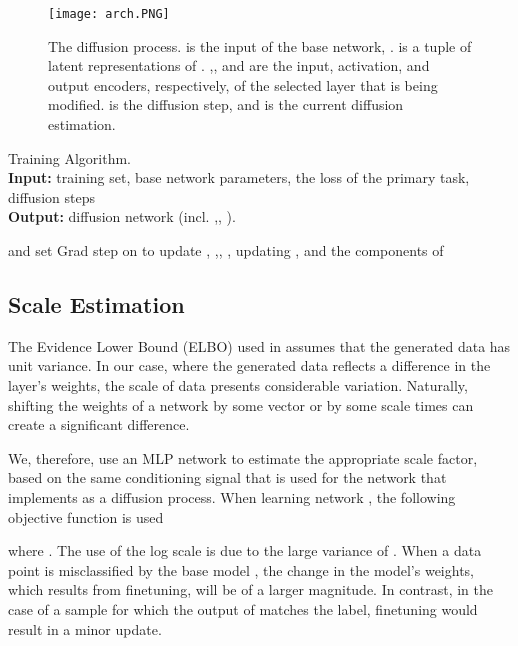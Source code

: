 \documentclass{article}
\theoremstyle{plain}
\begin{document}
\begin{figure}
    \centering
    \texttt{[image: arch.PNG]}
    \caption{The diffusion process.      is the input of the base network, .  is a tuple of latent representations of . 
    ,, and  are the input, activation, and output encoders, respectively, of the selected layer that is being modified.  is the diffusion step, and  is the current diffusion estimation.}
    \label{fig:array_arc}
\end{figure}

\begin{algorithm}[t]
    \caption{Training Algorithm. \\ \textbf{Input:}  training set,  base network parameters,  the loss of the primary task,   diffusion steps\\
\textbf{Output:}  diffusion network (incl. ,, ).}
\label{alg:diffalg}
\begin{algorithmic}[1]
\REPEAT
\STATE {} and set 
\REPEAT
    \STATE Grad step on  to update   \label{lst:line:overfitting_alg_part}
\label{lst:loopends}
\STATE  \label{lst:line:normalizing}
\STATE , 
\STATE ,,
 \label{scheduling}
\STATE   \label{sampling}
\STATE {} , updating ,  and the components of \label{lst:line:objective}
\end{algorithmic}
\end{algorithm}




\subsection{Scale Estimation}
\label{subsec:Scale}

The Evidence Lower Bound (ELBO) used in \citet{ho2020denoising} assumes that the generated data has unit variance. In our case, where the generated data reflects a difference in the layer's weights, the scale of data presents considerable variation. Naturally, shifting the weights of a network by some vector  or by some scale times  can create a significant difference. 

We, therefore, use an MLP network  to estimate the appropriate scale factor, based on the same conditioning signal that is used for the network  that implements  as a diffusion process. 
When learning network , the following objective function is used

where .
The use of the log scale is due to the large variance of . When a data point  is misclassified by the base model , the change in the model's weights, which results from finetuning, will be of a larger magnitude. In contrast, in the case of a sample   for which the output of  matches the label, finetuning would result in a minor update.
\end{document}
